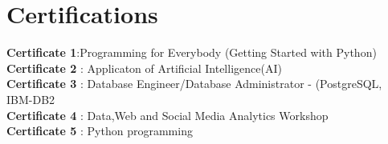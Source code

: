 \documentclass[letterpaper,11pt]{article}
\begin{document}
\section{Certifications}
\textbf{Certificate 1}{:Programming for Everybody (Getting Started with Python)} \\
\textbf{Certificate 2} {: Applicaton of Artificial Intelligence(AI)} \\
\textbf{Certificate 3} {: Database Engineer/Database Administrator - (PostgreSQL, IBM-DB2} \\
\textbf{Certificate 4} {: Data,Web and Social Media Analytics Workshop} \\
\textbf{Certificate 5} {: Python programming}
\end{document}
